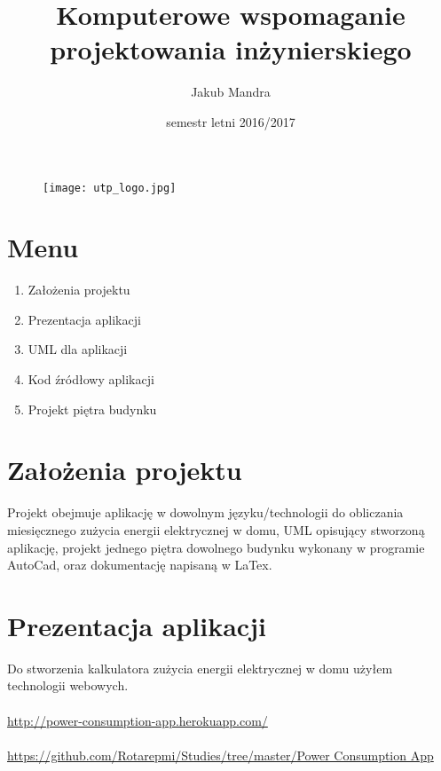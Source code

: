 \documentclass[a4paper]{article}
\title{Komputerowe wspomaganie projektowania inżynierskiego}
\author{Jakub Mandra}
\date{semestr letni 2016/2017}
\begin{document}
\begin{figure}
   \texttt{[image: utp\_logo.jpg]}
\end{figure}

\maketitle

\newpage

\section{Menu}

\begin{enumerate}
    \item Założenia projektu
    \item Prezentacja aplikacji
    \item UML dla aplikacji
    \item Kod źródłowy aplikacji
    \item Projekt piętra budynku
\end{enumerate}  

\newpage

\section{Założenia projektu}

{Projekt obejmuje aplikację w dowolnym języku/technologii do obliczania miesięcznego zużycia energii elektrycznej w domu, UML opisujący stworzoną aplikację, projekt jednego piętra dowolnego budynku wykonany w programie AutoCad, oraz dokumentację napisaną w LaTex.}

\section{Prezentacja aplikacji}
{Do stworzenia kalkulatora zużycia energii elektrycznej w domu użyłem technologii webowych.}
\\
\\
\href{http://power-consumption-app.herokuapp.com/}{http://power-consumption-app.herokuapp.com/}
\\
\\
\href{https://github.com/Rotarepmi/Studies/tree/master/Power Consumption App}{https://github.com/Rotarepmi/Studies/tree/master/Power Consumption App}
\end{document}
